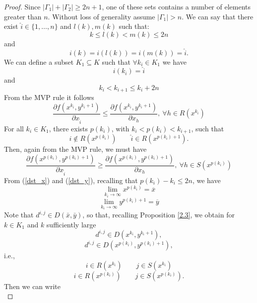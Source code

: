 \begin{proof}
Since $|\Gamma_1|+|\Gamma_2|\ge 2n+1$, one of these sets contains a number of elements greater than $n$. 
Without loss of generality assume $|\Gamma_1|> n$.
We can say that there exist $ \hat i \in \{1,\ldots,n\}$ and $l(k),m(k)$ such that:
 \begin{equation}
  k\le l(k) <m(k)\le 2 n
 \end{equation}
and
\begin{equation}
 i(k) = i(l(k))=i(m(k))=\hat i.
\end{equation}
We can define a subset $K_1 \subseteq K$ such that $\forall k_i \in K_1$ we have
\begin{equation}
 i(k_i)=\hat i
\end{equation}
and
\begin{equation}
 k_i <k_{i+1} \le k_i+2n
\end{equation}
From the MVP rule it follows
\begin{equation}
 \frac{\partial f(x^{k_i},y^{k_i+1})}{\partial x_{\hat i}} \le \frac{\partial f(x^{k_i},y^{k_i+1})}{\partial x_{h}}, \ \forall h \in R(x^{k_i})
\end{equation}
For all $k_i \in K_1$, there exists $p(k_i)$, with  $k_i <p(k_i)<k_{i+1}$, such that
\begin{equation}
 \hat i \not \in R(x^{p(k_i)})\quad\quad \hat i \in R(x^{p(k_i)+1}).
\end{equation}
Then, again from the MVP rule, we must have
\begin{equation}
 \frac{\partial f(x^{p(k_i)},y^{p(k_i)+1})}{\partial x_{\hat i}} \ge \frac{\partial f(x^{p(k_i)},y^{p(k_i)+1})}{\partial x_{h}}, \ \forall h \in S(x^{p(k_i)})
\end{equation}
From (\ref{dst_x}) and (\ref{dst_y}), recalling that  $p(k_i)-k_i \le 2n$, we have
$$
 \lim_{k_i\rightarrow \infty} x^{p(k_i)}=\overline{x}
$$
$$
 \lim_{k_i\rightarrow \infty} y^{p(k_i)+1}=\overline{y}
$$
Note that $d^{i,j}\in D(\bar x,\bar y)$, so that, recalling Proposition \ref{2.3}, we obtain for
$k\in K_1$ and $k$ sufficiently large
\begin{equation}\label{dij_dka}
 d^{i,j}\in D(x^{k_i},y^{k_i+1}),
\end{equation}
\begin{equation}\label{dij_dkbis}
 d^{i,j}\in D(x^{p(k_i)},y^{p(k_i)+1}),
\end{equation}
i.e.,
$$
i\in R(x^{k_i})\quad\quad j\in S(x^{k_i})
$$ 
$$
i\in R(x^{p(k_i)})\quad\quad j\in S(x^{p(k_i)}).
$$
Then  we can write
\begin{equation}\label{eq:direction1}

\end{equation}
\end{proof}
